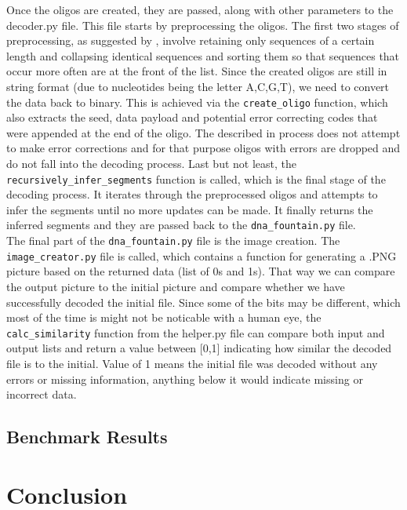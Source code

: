 \documentclass[12pt]%
{article}
\begin{document}
Once the oligos are created, they are passed, along with other parameters to the decoder.py file. This file starts by preprocessing the oligos. The first two stages of preprocessing, as suggested by \cite{erlich2017dnasupplementary}, involve retaining only sequences of a certain length and collapsing identical sequences and sorting them so that sequences that occur more often are at the front of the list. Since the created oligos are still in string format (due to nucleotides being the letter A,C,G,T), we need to convert the data back to binary. This is achieved via the \texttt{create\_oligo} function, which also extracts the seed, data payload and potential error correcting codes that were appended at the end of the oligo. The described in \cite{erlich2017dna} process does not attempt to make error corrections and for that purpose oligos with errors are dropped and do not fall into the decoding process. Last but not least, the \texttt{recursively\_infer\_segments} function is called, which is the final stage of the decoding process. It iterates through the preprocessed oligos and attempts to infer the segments until no more updates can be made. It finally returns the inferred segments and they are passed back to the \texttt{dna\_fountain.py} file. \\
The final part of the \texttt{dna\_fountain.py} file is the image creation. The \texttt{image\_creator.py} file is called, which contains a function for generating a .PNG picture based on the returned data (list of 0s and 1s). That way we can compare the output picture to the initial picture and compare whether we have successfully decoded the initial file. Since some of the bits may be different, which most of the time is might not be noticable with a human eye, the \texttt{calc\_similarity} function from the helper.py file can compare both input and output lists and return a value between [0,1] indicating how similar the decoded file is to the initial. Value of 1 means the initial file was decoded without any errors or missing information, anything below it would indicate missing or incorrect data.


\subsection{Benchmark Results}

\section{Conclusion}
\end{document}
